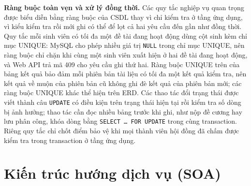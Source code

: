 \documentclass[../main.tex]{subfiles}
\begin{document}
\textbf{Ràng buộc toàn vẹn và xử lý đồng thời.} Các quy tắc nghiệp vụ quan trọng được biểu diễn bằng ràng buộc của CSDL thay vì chỉ kiểm tra ở tầng ứng dụng, vì kiểu kiểm tra rồi mới ghi có thể để lọt cả hai yêu cầu đến gần như đồng thời. Quy tắc mỗi sinh viên có tối đa một đề tài đang hoạt động dùng cột sinh  kèm chỉ mục UNIQUE: MySQL cho phép nhiều giá trị \texttt{NULL} trong chỉ mục UNIQUE, nên ràng buộc chỉ chặn khi cùng một sinh viên xuất hiện ở hai đề tài đang hoạt động, và Web API trả mã 409 cho yêu cầu ghi thứ hai. Ràng buộc UNIQUE trên  của bảng kết quả bảo đảm mỗi phiên bản tài liệu có tối đa một kết quả kiểm tra, nên kết quả về muộn của phiên bản cũ không ghi đè kết quả của phiên bản mới; các ràng buộc UNIQUE khác thể hiện trên ERD. Các thao tác đổi trạng thái được viết thành câu \texttt{UPDATE} có điều kiện trên trạng thái hiện tại rồi kiểm tra số dòng bị ảnh hưởng; thao tác cần đọc nhiều bảng trước khi ghi, như nộp đề cương hay lưu phân công, khóa dòng bằng \texttt{SELECT \ldots{} FOR UPDATE} trong cùng transaction. Riêng quy tắc chỉ chốt điểm bảo vệ khi mọi thành viên hội đồng đã chấm được kiểm tra trong transaction ở tầng ứng dụng.

\section{Kiến trúc hướng dịch vụ (SOA)}\label{sec:c3-kien-truc}
\end{document}
